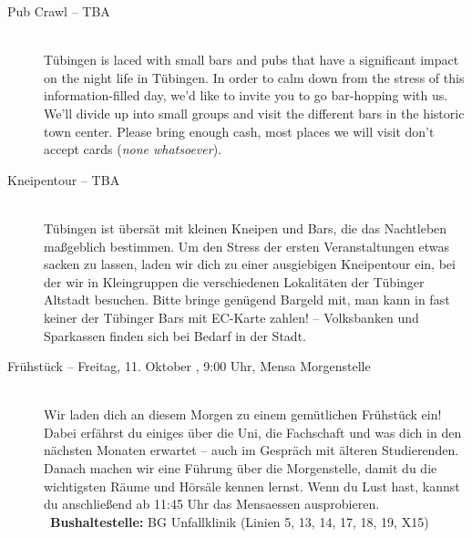 \begin{description}
\ifml
	\item[Pub Crawl -- TBA]~\\
	Tübingen is laced with small bars and pubs that have a significant impact on the night life in Tübingen.
	In order to calm down from the stress of this information-filled day, we'd like to invite you to go bar-hopping with us.
	We'll divide up into small groups and visit the different bars in the historic town center.
	Please bring enough cash, most places we will visit don't accept cards (\emph{none whatsoever}).
\else
	\item[Kneipentour -- TBA]~\\
	Tübingen ist übersät mit kleinen Kneipen und Bars, die das Nachtleben maßgeblich bestimmen.
	Um den Stress der ersten Veranstaltungen etwas sacken zu lassen, laden wir dich zu einer ausgiebigen Kneipentour ein,
	bei der wir in Kleingruppen die verschiedenen Lokalitäten der Tübinger Altstadt besuchen.
	Bitte bringe genügend Bargeld mit, man kann in fast keiner der Tübinger Bars mit EC-Karte zahlen! -- Volksbanken und Sparkassen finden sich bei Bedarf in der Stadt.
\fi

\ifbachelor \pagebreak  \fi

\ifbachelor
 	\item[Frühstück -- Freitag, 11. Oktober \YEAR, 9:00 Uhr, Mensa Morgenstelle]\ \\
 	Wir laden dich an diesem Morgen zu einem gemütlichen Frühstück ein! Dabei erfährst du einiges über die Uni, die Fachschaft und was dich in den nächsten Monaten erwartet -- auch im Gespräch mit älteren Studierenden.
 	Danach machen wir eine Führung über die Morgenstelle, damit du die wichtigsten Räume und Hörsäle kennen lernst.
 	Wenn du Lust hast, kannst du anschließend ab 11:45 Uhr das Mensaessen ausprobieren.\\
 	~\textbf{Bushaltestelle:} BG Unfallklinik (Linien 5, 13, 14, 17, 18, 19, X15)
\fi


\end{description}
